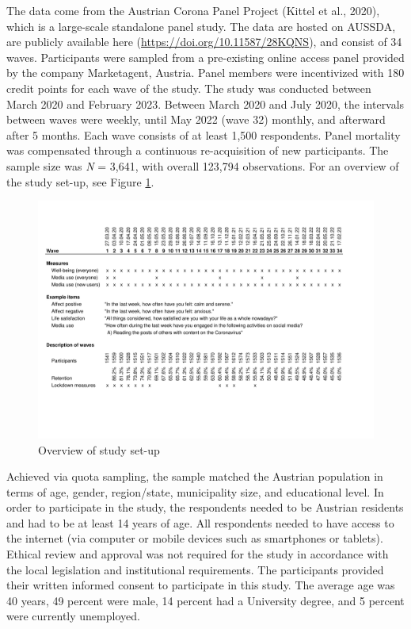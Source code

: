 \documentclass[
  man,mask,floatsintext]{apa7}
\begin{document}
The data come from the Austrian Corona Panel Project (Kittel et al., 2020), which is a large-scale standalone panel study.
The data are hosted on AUSSDA, are publicly available here (\url{https://doi.org/10.11587/28KQNS}), and consist of 34 waves.
Participants were sampled from a pre-existing online access panel provided by the company Marketagent, Austria.
Panel members were incentivized with 180 credit points for each wave of the study.
The study was conducted between March 2020 and February 2023.
Between March 2020 and July 2020, the intervals between waves were weekly, until May 2022 (wave 32) monthly, and afterward after 5 months.
Each wave consists of at least 1,500 respondents.
Panel mortality was compensated through a continuous re-acquisition of new participants.
The sample size was \emph{N} = 3,641, with overall 123,794 observations.
For an overview of the study set-up, see Figure \ref{fig:study-desc}.

\begin{figure}
\includegraphics[width=1\textwidth]{figures/fig_study_description} \caption{Overview of study set-up}\label{fig:study-desc}
\end{figure}

Achieved via quota sampling, the sample matched the Austrian population in terms of age, gender, region/state, municipality size, and educational level.
In order to participate in the study, the respondents needed to be Austrian residents and had to be at least 14 years of age.
All respondents needed to have access to the internet (via computer or mobile devices such as smartphones or tablets).
Ethical review and approval was not required for the study in accordance with the local legislation and institutional requirements.
The participants provided their written informed consent to participate in this study.
The average age was 40 years, 49 percent were male, 14 percent had a University degree, and 5 percent were currently unemployed.
\end{document}

